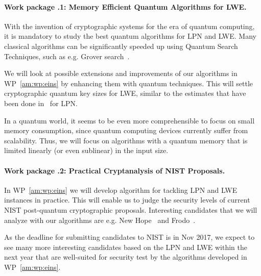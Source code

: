 \label{am:wp:zwei}


\paragraph{Work package \theworkpackage.1: Memory Efficient Quantum Algorithms for LWE.}

With the invention of cryptographic systems for the era of quantum computing, it is mandatory to study the best quantum algorithms for LPN and LWE. Many classical algorithms can be significantly speeded up using Quantum Search Techniques, such as e.g. Grover search~\cite{Grover96}.

We will look at possible extensions and improvements of our algorithms in WP~\ref{am:wp:eins} by enhancing them with quantum techniques. This will settle cryptographic quantum key sizes for LWE, similar to the estimates that have been done in~\cite{LPN} for LPN.

In a quantum world, it seems to be even more comprehensible to focus on small memory consumption, since quantum computing devices currently suffer from scalability. Thus, we will focus on algorithms with a quantum memory that is limited linearly (or even sublinear) in the input size.

\paragraph{Work package \theworkpackage.2: Practical Cryptanalysis of NIST Proposals.} In WP~\ref{am:wp:eins} we will develop algorithm for tackling LPN and LWE instances in practice. This will enable us to judge the security levels of current NIST post-quantum cryptographic proposals. Interesting candidates that we will analyze with our algorithms are e.g. New Hope~\cite{ADPS16} and Frodo~\cite{BCDMNNRS16}. 

As the deadline for submitting candidates to NIST is in Nov 2017, we expect to see many more interesting candidates based on the LPN and LWE within the next year that are well-suited for security test by the algorithms developed in WP~\ref{am:wp:eins}.
